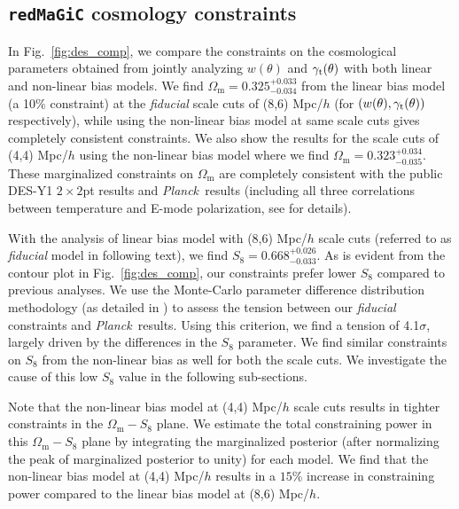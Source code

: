 \documentclass[aps, prd,twocolumn,superscriptaddress,nofootinbib,preprintnumbers]{revtex4-1}
\newcommand{\gammat}{\ensuremath{\gamma_{\rm t}(\theta)}}
\newcommand{\wtheta}{\ensuremath{w(\theta)}}
\newcommand{\om}{\ensuremath{\Omega_{\mathrm m}}}
\newcommand{\redmagic}{\texttt{redMaGiC} }
\newcommand{\Planck}{{\slshape Planck~}}
\begin{document}
\subsection{\redmagic cosmology constraints}
\label{sec:fid_cosmo_res}
In Fig.~\ref{fig:des_comp}, we compare the constraints on the cosmological parameters obtained from jointly analyzing $\wtheta$ and $\gammat$ with both linear and non-linear bias models. 
We find $\om = 0.325^{+0.033}_{-0.034}$ from the linear bias model (a 10\% constraint) at the \textit{fiducial} scale cuts of (8,6) Mpc/$h$ (for $(w(\theta),\gamma_{\rm t}(\theta))$ respectively), while using the non-linear bias model at same scale cuts gives completely consistent constraints.
We also show the results for the scale cuts of (4,4) Mpc/$h$ using the non-linear bias model where we find $\om=0.323^{+0.034}_{-0.035}$. These marginalized constraints on $\om$ are completely consistent with the public DES-Y1  $2\times 2$pt results \citep{Abbott_2018} and \Planck results (including all  three correlations between temperature and E-mode polarization, see \citet{Planck_2018_cosmo} for details). 

With the analysis of linear bias model with (8,6) Mpc/$h$ scale cuts (referred to as \textit{fiducial}  model in following text), we find $S_8 = 0.668^{+0.026}_{-0.033}$. As is evident from the contour plot in Fig.~\ref{fig:des_comp}, our constraints prefer lower $S_8$ compared to previous analyses.  We use the Monte-Carlo parameter difference distribution methodology (as detailed in \citet*{y3-tensions}) to assess the tension between our \textit{fiducial} constraints and \Planck results. Using this criterion, we find a tension of 4.1$\sigma$, largely driven by the differences in the $S_8$ parameter. We find similar constraints on $S_8$ from the non-linear bias as well for both the scale cuts. We investigate the cause of this low $S_8$ value in the following sub-sections. 

Note that the non-linear bias model at (4,4) Mpc/$h$ scale cuts results in tighter constraints in the $\om-S_8$ plane. We estimate the total constraining power in this $\om-S_8$ plane by integrating the marginalized posterior (after normalizing the peak of marginalized posterior to unity) for each model. 
We find that the non-linear bias model at  (4,4) Mpc/$h$ results in a $15$\% increase in constraining power compared to the linear bias model at (8,6) Mpc/$h$. 
\end{document}
